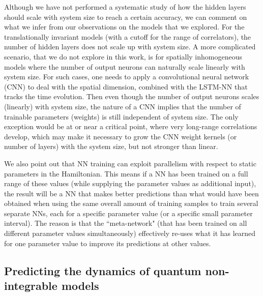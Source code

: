 \documentclass[a4paper,aps,amsmath,amssymb,twocolumn,longbibliography,,accepted=2022-05-17]{quantumarticle}
\begin{document}

Although we have not performed a systematic study of how the hidden layers should scale with system size to reach a certain accuracy, we can comment on what we infer from our observations on the models that we explored. For the translationally invariant models (with a cutoff for the range of correlators), the number of hidden layers does not scale up with system size.  A more complicated scenario, that we do not explore in this work, is for spatially inhomogeneous models where the number of output neurons can naturally scale linearly with system size. For such cases, one needs to apply a convolutional neural network (CNN) to deal with the spatial dimension, combined with the LSTM-NN that tracks the time evolution. Then even though the number of output neurons  scales (linearly) with system size, the nature of a CNN implies that the number of trainable parameters (weights) is still independent of system size. The only exception would be at or near a critical point, where very long-range correlations develop, which may make it necessary to grow the CNN weight kernels (or number of layers) with the system size, but not stronger than linear. 


We also point out that NN training can exploit parallelism with respect to static parameters in the Hamiltonian. This means if a NN has been trained on a full range of these values (while supplying the parameter values as additional input), the result will be a NN that makes better predictions than what would have been obtained when using the same overall amount of training samples to train several separate NNs, each for a specific parameter value (or a specific small parameter interval). The reason is that the ``meta-network" (that has been trained on all different parameter values simultaneously) effectively re-uses what it has learned for one parameter value to improve its predictions at other values.


\subsection{Predicting the dynamics of quantum non-integrable models \label{integrability}}
\end{document}
